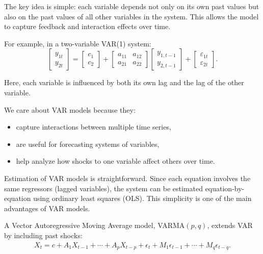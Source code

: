 \documentclass[10pt,a4paper]{article}
\begin{document}
	The key idea is simple: each variable depends not only on its own past values but also on the past values of all other variables in the system. This allows the model to capture feedback and interaction effects over time.
	
	For example, in a two-variable VAR(1) system:
	\begin{equation*}
	\begin{bmatrix} y_{1t} \\ y_{2t} \end{bmatrix}
	=
	\begin{bmatrix} c_1 \\ c_2 \end{bmatrix}
	+
	\begin{bmatrix} a_{11} & a_{12} \\ a_{21} & a_{22} \end{bmatrix}
	\begin{bmatrix} y_{1,t-1} \\ y_{2,t-1} \end{bmatrix}
	+
	\begin{bmatrix} \varepsilon_{1t} \\ \varepsilon_{2t} \end{bmatrix}.
	\end{equation*}
	
	Here, each variable is influenced by both its own lag and the lag of the other variable.
	
	We care about VAR models because they:
	\begin{itemize}
	\item capture interactions between multiple time series,
	\item are useful for forecasting systems of variables,
	\item help analyze how shocks to one variable affect others over time.
	\end{itemize}
	
	Estimation of VAR models is straightforward. Since each equation involves the same regressors (lagged variables), the system can be estimated equation-by-equation using ordinary least squares (OLS). This simplicity is one of the main advantages of VAR models.
	
	\vspace{0.5em}
	
	A Vector Autoregressive Moving Average model, VARMA$(p,q)$, extends VAR by including past shocks:
	\begin{align*}
	X_t = c + A_1 X_{t-1} + \cdots + A_p X_{t-p} + \epsilon_t + M_1 \epsilon_{t-1} + \cdots + M_q \epsilon_{t-q}.
	\end{align*}
	
\end{document}
